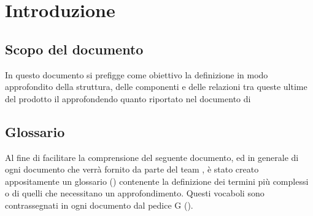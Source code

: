 \section{Introduzione}
\subsection{Scopo del documento}
In questo documento si prefigge come obiettivo la definizione in modo approfondito della struttura, delle componenti e delle relazioni tra queste ultime del prodotto il \progetto approfondendo quanto riportato nel documento di \doctitleST
\subsection{Glossario}
Al fine di facilitare la comprensione del seguente documento, ed in generale di ogni documento che verrà fornito da parte del team \gruppo , è stato creato appositamente un glossario (\textit{\Glossario}) contenente la definizione dei termini più complessi o di quelli che necessitano un approfondimento. Questi vocaboli sono contrassegnati in ogni documento dal pedice G ().